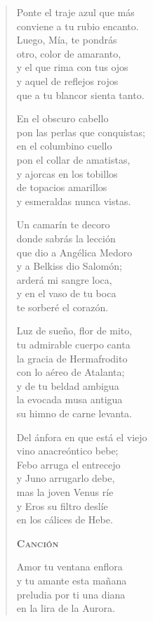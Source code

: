 \documentclass[12pt]{article}
\begin{document}
\begin{verse}
Ponte el traje azul que más\\
conviene a tu rubio encanto.\\
Luego, Mía, te pondrás\\
otro, color de amaranto,\\
y el que rima con tus ojos\\
y aquel de reflejos rojos\\
que a tu blancor sienta tanto.  

En el obscuro cabello\\
pon las perlas que conquistas;\\
en el columbino cuello\\
pon el collar de amatistas,\\
y ajorcas en los tobillos\\
de topacios amarillos\\
y esmeraldas nunca vistas.  

Un camarín te decoro\\
donde sabrás la lección\\
que dio a Angélica Medoro\\
y a Belkiss dio Salomón;\\
arderá mi sangre loca,\\
y en el vaso de tu boca\\
te sorberé el corazón.  

Luz de sueño, flor de mito,\\
tu admirable cuerpo canta\\
la gracia de Hermafrodito\\
con lo aéreo de Atalanta;\\
y de tu beldad ambigua\\
la evocada musa antigua\\
su himno de carne levanta.  

Del ánfora en que está el viejo\\
vino anacreóntico bebe;\\
Febo arruga el entrecejo\\
y Juno arrugarlo debe,\\
mas la joven Venus ríe\\
y Eros su filtro deslíe\\
en los cálices de Hebe.  

{\bfseries\scshape {Canción}}

Amor tu ventana enflora\\
y tu amante esta mañana\\
preludia por ti una diana\\
en la lira de la Aurora.  


\end{verse}
\end{document}
